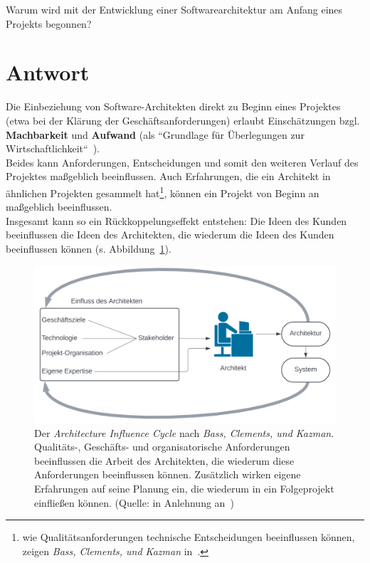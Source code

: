 Warum wird mit der Entwicklung einer Softwarearchitektur am Anfang eines Projekts begonnen?

\section*{Antwort}
Die Einbeziehung von Software-Architekten direkt zu Beginn eines Projektes (etwa bei der Klärung der Geschäftsanforderungen) erlaubt Einschätzungen bzgl. \textbf{Machbarkeit} und \textbf{Aufwand} (als ``Grundlage für Überlegungen zur Wirtschaftlichkeit``~\cite[37]{Wed09b}).\\
Beides kann Anforderungen, Entscheidungen und somit den weiteren Verlauf des Projektes maßgeblich beeinflussen.
Auch Erfahrungen, die ein Architekt in ähnlichen Projekten gesammelt hat\footnote{
    wie Qualitätsanforderungen technische Entscheidungen beeinflussen können, zeigen \textit{Bass, Clements, und Kazman} in~\cite[41]{BCK12}.
}, können ein Projekt von Beginn an maßgeblich beeinflussen.\\
Insgesamt kann so ein Rückkoppelungseffekt entstehen: Die Ideen des Kunden beeinflussen die Ideen des Architekten, die wiederum die Ideen des Kunden beeinflussen können (s. Abbildung~\ref{fig:aic}).\\


\begin{figure}
    \centering
    \includegraphics[scale=0.4]{chapters/aufgabe 6/img/aic}
    \caption{Der \textit{Architecture Influence Cycle} nach \textit{Bass, Clements, und Kazman}. Qualitäts-, Geschäfts- und organisatorische Anforderungen beeinflussen die Arbeit des Architekten, die wiederum diese Anforderungen beeinflussen können. Zusätzlich wirken eigene Erfahrungen auf seine Planung ein, die wiederum in ein Folgeprojekt einfließen können.  (Quelle: in Anlehnung an~\cite[58, Figure 3.5]{BCK12})}
    \label{fig:aic}
\end{figure}